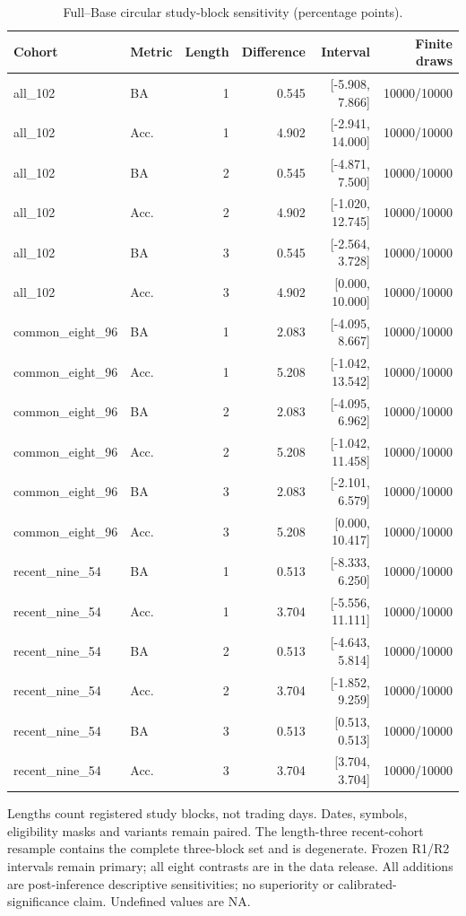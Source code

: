 \begin{table}[htbp]
\centering\small
\caption{Full--Base circular study-block sensitivity (percentage points).}
\label{tab:d205_blocks}
\setlength{\tabcolsep}{3.5pt}
\begin{tabular}{llrrrr}
\hline
Cohort & Metric & Length & Difference & Interval & Finite draws \\
\hline
all\_102 & BA & 1 & 0.545 & [-5.908, 7.866] & 10000/10000 \\
all\_102 & Acc. & 1 & 4.902 & [-2.941, 14.000] & 10000/10000 \\
all\_102 & BA & 2 & 0.545 & [-4.871, 7.500] & 10000/10000 \\
all\_102 & Acc. & 2 & 4.902 & [-1.020, 12.745] & 10000/10000 \\
all\_102 & BA & 3 & 0.545 & [-2.564, 3.728] & 10000/10000 \\
all\_102 & Acc. & 3 & 4.902 & [0.000, 10.000] & 10000/10000 \\
common\_eight\_96 & BA & 1 & 2.083 & [-4.095, 8.667] & 10000/10000 \\
common\_eight\_96 & Acc. & 1 & 5.208 & [-1.042, 13.542] & 10000/10000 \\
common\_eight\_96 & BA & 2 & 2.083 & [-4.095, 6.962] & 10000/10000 \\
common\_eight\_96 & Acc. & 2 & 5.208 & [-1.042, 11.458] & 10000/10000 \\
common\_eight\_96 & BA & 3 & 2.083 & [-2.101, 6.579] & 10000/10000 \\
common\_eight\_96 & Acc. & 3 & 5.208 & [0.000, 10.417] & 10000/10000 \\
recent\_nine\_54 & BA & 1 & 0.513 & [-8.333, 6.250] & 10000/10000 \\
recent\_nine\_54 & Acc. & 1 & 3.704 & [-5.556, 11.111] & 10000/10000 \\
recent\_nine\_54 & BA & 2 & 0.513 & [-4.643, 5.814] & 10000/10000 \\
recent\_nine\_54 & Acc. & 2 & 3.704 & [-1.852, 9.259] & 10000/10000 \\
recent\_nine\_54 & BA & 3 & 0.513 & [0.513, 0.513] & 10000/10000 \\
recent\_nine\_54 & Acc. & 3 & 3.704 & [3.704, 3.704] & 10000/10000 \\
\hline
\end{tabular}
\par\smallskip\footnotesize Lengths count registered study blocks, not trading days. Dates, symbols, eligibility masks and variants remain paired. The length-three recent-cohort resample contains the complete three-block set and is degenerate. Frozen R1/R2 intervals remain primary; all eight contrasts are in the data release. All additions are post-inference descriptive sensitivities; no superiority or calibrated-significance claim. Undefined values are NA.
\end{table}

